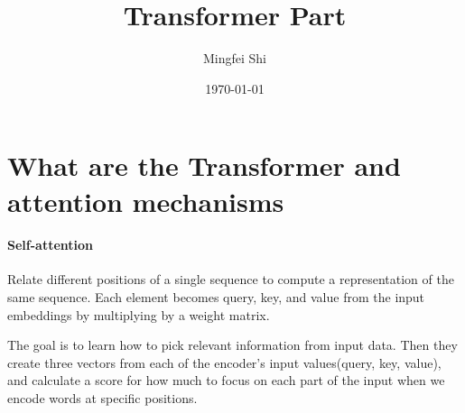 \documentclass[11pt]{article}
\author{Mingfei Shi}
\title{Transformer Part}
\date{\today}
\begin{document}
    \maketitle
    \newpage
\section{What are the Transformer and attention mechanisms}\label{sec:what-are-the-transformer-and-attention-mechanisms}

\paragraph{Self-attention} Relate different positions of a single sequence to compute a representation of the same sequence.
    Each element becomes query, key, and value from the input embeddings by multiplying by a weight matrix.

    The goal is to learn how to pick relevant information from input data.
    Then they create three vectors from each of the encoder's input values(query, key, value), and calculate a score for how much
    to focus on each part of the input when we encode words at specific positions.
\end{document}
